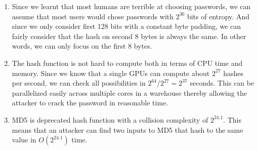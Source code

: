 \documentclass{article}
\begin{document}
\begin{enumerate}
        \item Since we learnt that most humans are terrible at choosing passwords, we can assume that most users would chose passwords with $2^{30}$ bits of entropy. And since we only consider first 128 bits with a constant byte padding, we can fairly consider that the hash on second 8 bytes is always the same. In other words, we can only focus on the first 8 bytes.

        \item The hash function is not hard to compute both in terms of CPU time and memory. Since we know that a single GPUs can compute about $2^{27}$ hashes per second, we can check all possibilities in $2^{64} / 2^{27} = 2^{37}$ seconds. This can be parallelized easily across multiple cores in a warehouse thereby allowing the attacker to crack the password in reasonable time.

        \item MD5 is deprecated hash function with a collision complexity of $2^{24.1}$. This means that an attacker can find two inputs to MD5 that hash to the same value in $O(2^{24.1})$ time.
    \end{enumerate}
\end{document}
